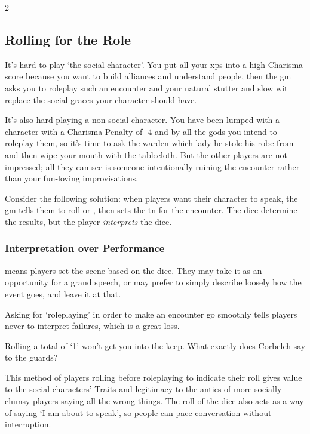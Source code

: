 \begin{multicols}{2}
\subsection{Rolling for the Role}
\label{rollForRoles}

\noindent
It's hard to play `the social character'.
You put all your \glspl{xp} into a high Charisma score because you want to build alliances and understand people, then the \gls{gm} asks you to roleplay such an encounter and your natural stutter and slow wit replace the social graces your character should have.

It's also hard playing a non-social character.
You have been lumped with a character with a Charisma Penalty of -4 and by all the gods you intend to roleplay them, so it's time to ask the \gls{warden} which lady he stole his robe from and then wipe your mouth with the tablecloth.
But the other players are not impressed; all they can see is someone intentionally ruining the encounter rather than your fun-loving improvisations.

Consider the following solution: when players want their character to speak, the \gls{gm} tells them to roll  or , then sets the \gls{tn} for the encounter.
The dice determine the results, but the player \emph{interprets} the dice.

\subsubsection{Interpretation over Performance}
means players set the scene based on the dice.
They may take it as an opportunity for a grand speech, or may prefer to simply describe loosely how the event goes, and leave it at that.

Asking for `roleplaying' in order to make an encounter go smoothly tells players never to interpret failures, which is a great loss.

\begin{speechtext}
  Rolling a total of `1' won't get you into the keep.
  What exactly does Corbelch say to the guards?
\end{speechtext}
This method of players rolling before roleplaying to indicate their roll gives value to the social characters' Traits and legitimacy to the antics of more socially clumsy players saying all the wrong things.
The roll of the dice also acts as a way of saying `I am about to speak', so people can pace conversation without interruption.

\end{multicols}

